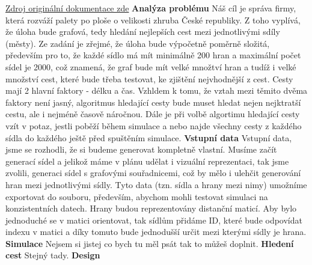 \documentclass[ 12pt, a4paper]{report}
\begin{document}
\href{http://home.zcu.cz/~prokop/std_zadani.pdf}{Zdroj originální dokumentace zde}\newpage
{\Large\bf\noindent Analýza problému}\newline\newline
Náš cíl je správa firmy, která rozváží palety po ploše o velikosti zhruba České republiky. Z toho vyplívá, že úloha bude grafová, tedy hledání nejlepších cest mezi jednotlivými sdíly (městy).\newline
Ze zadání je zřejmé, že úloha bude výpočetně poměrně složitá, především pro to, že každé sídlo má mít minimálně 200 hran a maximální počet sídel je 2000, což znamená, že graf bude mít velké množtví hran a tudíž i velké množství cest, které bude třeba testovat, ke zjištění nejvhodnější z cest. Cesty mají 2 hlavní faktory - délku a čas. Vzhldem k tomu, že vztah mezi těmito dvěma faktory není jasný, algoritmus hledající cesty bude muset hledat nejen nejktratší cestu, ale i nejméně časově náročnou. Dále je při volbě algortimu hledající cesty vzít v potaz, jestli poběží během simulace a nebo najde všechny cesty z každého sídla do každého ještě před spuštěním simulace.\newline\newline
{\large\bf Vstupní data}\newline
Vstupní data, jsme se rozhodli, že si budeme generovat kompletně vlastní. Musíme začít generací sídel a jelikož máme v plánu udělat i vizuální reprezentaci, tak jsme zvolili, generaci sídel s grafovými souřadnicemi, což by mělo i ulehčit generování hran mezi jednotlivými sídly. Tyto data (tzn. sídla a hrany mezi nimy) umožníme exportovat do souboru, především, abychom mohli testovat simulaci na konzistentních datech.\newline
Hrany budou reprezentovány distanční maticí. Aby bylo jednoduché se v matici orientovat, tak sídlům přidáme ID, které bude odpovídat indexu v matici a díky tomuto bude jednodušší určit mezi kterými sídly je hrana.\newline\newline
{\large\bf Simulace}\newline
Nejsem si jistej co bych tu měl psát tak to můžeš doplnit.\newline\newline
{\large\bf Hledení cest}\newline
Stejný tady.\newpage
{\Large\bf\noindent Design}\newline\newline
\end{document}
